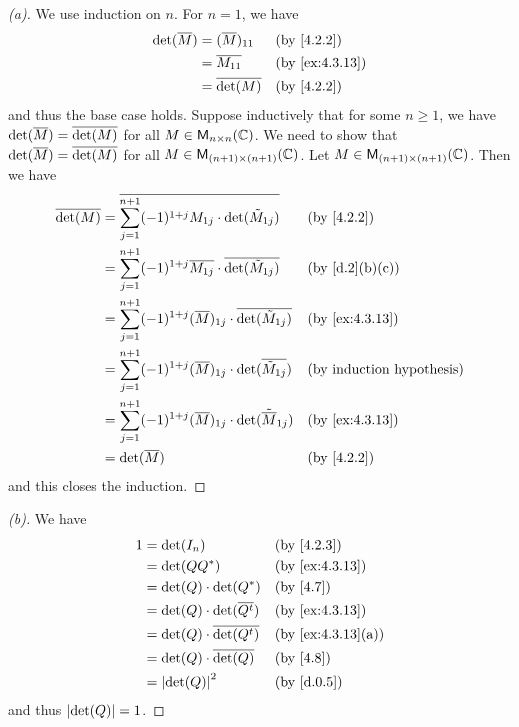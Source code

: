 \begin{proof}[(a)]
  We use induction on \(n\).
  For \(n = 1\), we have
  \begin{align*}
    \det(\conj{M}) & = (\conj{M})_{1 1} &  & \text{(by \cref{4.2.2})}     \\
                   & = \conj{M_{1 1}}   &  & \text{(by \cref{ex:4.3.13})} \\
                   & = \conj{\det(M)}   &  & \text{(by \cref{4.2.2})}
  \end{align*}
  and thus the base case holds.
  Suppose inductively that for some \(n \geq 1\), we have \(\det(\overline{M}) = \overline{\det(M)}\) for all \(M \in \mathsf{M}_{{n} \times n}({\mathbb{C}})\).
  We need to show that \(\det(\overline{M}) = \overline{\det(M)}\) for all \(M \in \mathsf{M}_{{(n + 1)} \times (n + 1)}({\mathbb{C}})\).
  Let \(M \in \mathsf{M}_{{(n + 1)} \times (n + 1)}({\mathbb{C}})\).
  Then we have
  \begin{align*}
    \conj{\det(M)} & = \conj{\sum_{j = 1}^{n + 1} (-1)^{1 + j} M_{1 j} \cdot \det(\tilde{M}_{1 j})}          &  & \text{(by \cref{4.2.2})}         \\
                   & = \sum_{j = 1}^{n + 1} (-1)^{1 + j} \conj{M_{1 j}} \cdot \conj{\det(\tilde{M}_{1 j})}   &  & \text{(by \cref{d.2}(b)(c))}     \\
                   & = \sum_{j = 1}^{n + 1} (-1)^{1 + j} (\conj{M})_{1 j} \cdot \conj{\det(\tilde{M}_{1 j})} &  & \text{(by \cref{ex:4.3.13})}     \\
                   & = \sum_{j = 1}^{n + 1} (-1)^{1 + j} (\conj{M})_{1 j} \cdot \det(\conj{\tilde{M}_{1 j}}) &  & \text{(by induction hypothesis)} \\
                   & = \sum_{j = 1}^{n + 1} (-1)^{1 + j} (\conj{M})_{1 j} \cdot \det(\tilde{\conj{M}}_{1 j}) &  & \text{(by \cref{ex:4.3.13})}     \\
                   & = \det(\conj{M})                                                                        &  & \text{(by \cref{4.2.2})}
  \end{align*}
  and this closes the induction.
\end{proof}

\begin{proof}[(b)]
  We have
  \begin{align*}
    1 & = \det(I_n)                         &  & \text{(by \cref{4.2.3})}        \\
      & = \det(Q Q^*)                       &  & \text{(by \cref{ex:4.3.13})}    \\
      & = \det(Q) \cdot \det(Q^*)           &  & \text{(by \cref{4.7})}          \\
      & = \det(Q) \cdot \det(\conj{\tp{Q}}) &  & \text{(by \cref{ex:4.3.13})}    \\
      & = \det(Q) \cdot \conj{\det(\tp{Q})} &  & \text{(by \cref{ex:4.3.13}(a))} \\
      & = \det(Q) \cdot \conj{\det(Q)}      &  & \text{(by \cref{4.8})}          \\
      & = \abs{\det(Q)}^2                   &  & \text{(by \cref{d.0.5})}
  \end{align*}
  and thus \(\left\lvert\det(Q)\right\rvert = 1\).
\end{proof}

